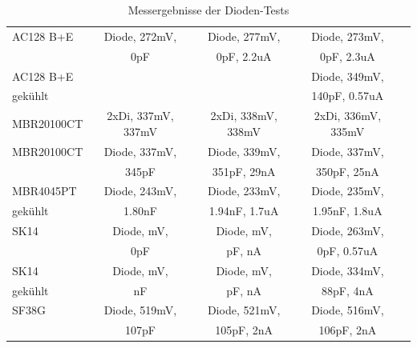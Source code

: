 \begin{table}[H]
\begin{center}
\begin{tabular}{| l | c | c | c | c |}
    \hline
AC128 B+E  & Diode, 272mV,        & Diode, 277mV,              & Diode, 273mV,             \\
           &               0pF    &               0pF, 2.2uA   &               0pF, 2.3uA  \\
    \hline
AC128 B+E  &                      &                     & Diode, 349mV,               \\
gekühlt    &                      &                     &               140pF, 0.57uA \\
    \hline
MBR20100CT & 2xDi, 337mV, 337mV   & 2xDi, 338mV, 338mV  & 2xDi, 336mV, 335mV  \\
    \hline
MBR20100CT & Diode, 337mV,        & Diode, 339mV,             & Diode, 337mV,            \\
           &               345pF  &               351pF, 29nA &               350pF, 25nA\\
    \hline
MBR4045PT  & Diode, 243mV,        & Diode, 233mV,               & Diode, 235mV,              \\
gekühlt    &               1.80nF &               1.94nF, 1.7uA &               1.95nF, 1.8uA\\
    \hline
SK14       & Diode,    mV,        & Diode,    mV,               & Diode, 263mV,              \\
           &                  0pF &                   pF,    nA &               0pF, 0.57uA\\
    \hline
SK14       & Diode,    mV,        & Diode,    mV,               & Diode, 334mV,              \\
gekühlt    &                   nF &                   pF,    nA &               88pF, 4nA\\
    \hline
SF38G      & Diode, 519mV,        & Diode, 521mV,            & Diode, 516mV,            \\
           &               107pF  &               105pF, 2nA &               106pF, 2nA \\
    \hline
    \end{tabular}
  \end{center}
  \caption{Messergebnisse der Dioden-Tests}
  \label{tab:diodes} 
\end{table}

